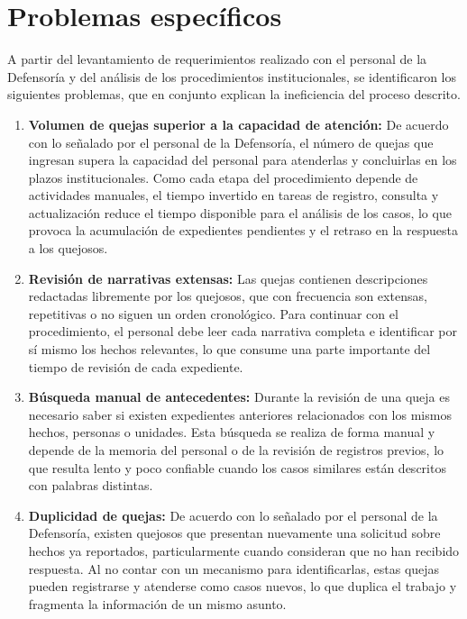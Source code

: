 	\section{Problemas específicos}
	A partir del levantamiento de requerimientos realizado con el personal de la Defensoría y del análisis de los procedimientos institucionales, se identificaron los siguientes problemas, que en conjunto explican la ineficiencia del proceso descrito.

	\begin{enumerate}
		\item \label{pe:volumen}\textbf{Volumen de quejas superior a la capacidad de atención:}
		De acuerdo con lo señalado por el personal de la Defensoría, el número de quejas que ingresan supera la capacidad del personal para atenderlas y concluirlas en los plazos institucionales. Como cada etapa del procedimiento depende de actividades manuales, el tiempo invertido en tareas de registro, consulta y actualización reduce el tiempo disponible para el análisis de los casos, lo que provoca la acumulación de expedientes pendientes y el retraso en la respuesta a los quejosos.

		\item \label{pe:narrativas}\textbf{Revisión de narrativas extensas:}
		Las quejas contienen descripciones redactadas libremente por los quejosos, que con frecuencia son extensas, repetitivas o no siguen un orden cronológico. Para continuar con el procedimiento, el personal debe leer cada narrativa completa e identificar por sí mismo los hechos relevantes, lo que consume una parte importante del tiempo de revisión de cada expediente.

		\item \label{pe:antecedentes}\textbf{Búsqueda manual de antecedentes:}
		Durante la revisión de una queja es necesario saber si existen expedientes anteriores relacionados con los mismos hechos, personas o unidades. Esta búsqueda se realiza de forma manual y depende de la memoria del personal o de la revisión de registros previos, lo que resulta lento y poco confiable cuando los casos similares están descritos con palabras distintas.

		\item \label{pe:duplicadas}\textbf{Duplicidad de quejas:}
		De acuerdo con lo señalado por el personal de la Defensoría, existen quejosos que presentan nuevamente una solicitud sobre hechos ya reportados, particularmente cuando consideran que no han recibido respuesta. Al no contar con un mecanismo para identificarlas, estas quejas pueden registrarse y atenderse como casos nuevos, lo que duplica el trabajo y fragmenta la información de un mismo asunto.


\end{enumerate}
